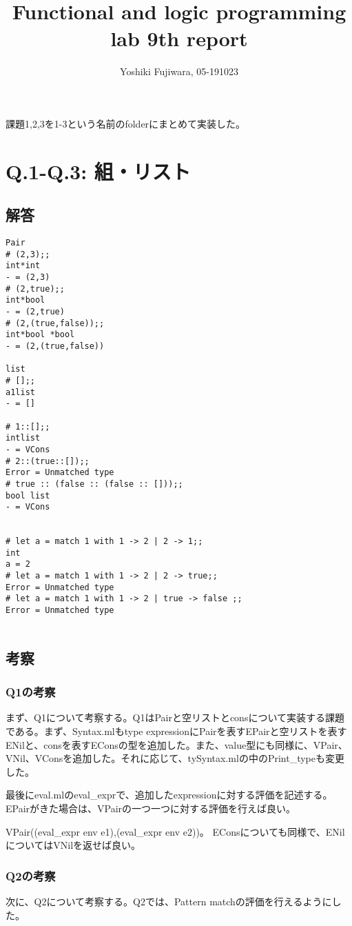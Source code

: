 \documentclass[uplatex,12pt]{jsarticle}
\title {Functional and logic programming lab 9th report}
\date{}
\begin{document}
\author{Yoshiki Fujiwara, 05-191023}
\maketitle

課題1,2,3を1-3という名前のfolderにまとめて実装した。

\section{Q.1-Q.3: 組・リスト}
\subsection{解答}
\begin{lstlisting}[caption=動作例]
Pair
# (2,3);;
int*int
- = (2,3)
# (2,true);;
int*bool
- = (2,true)
# (2,(true,false));;
int*bool *bool
- = (2,(true,false))

list
# [];;
a1list
- = []

# 1::[];;
intlist
- = VCons
# 2::(true::[]);;
Error = Unmatched type
# true :: (false :: (false :: []));;
bool list
- = VCons


# let a = match 1 with 1 -> 2 | 2 -> 1;;
int
a = 2
# let a = match 1 with 1 -> 2 | 2 -> true;;
Error = Unmatched type
# let a = match 1 with 1 -> 2 | true -> false ;;
Error = Unmatched type


\end{lstlisting}

\subsection{考察}
\subsubsection{Q1の考察}
まず、Q1について考察する。Q1はPairと空リストとconsについて実装する課題である。まず、Syntax.mlもtype expressionにPairを表すEPairと空リストを表すENilと、consを表すEConsの型を追加した。また、value型にも同様に、VPair、VNil、VConsを追加した。それに応じて、tySyntax.mlの中のPrint\_typeも変更した。

最後にeval.mlのeval\_exprで、追加したexpressionに対する評価を記述する。EPairがきた場合は、VPairの一つ一つに対する評価を行えば良い。

VPair((eval\_expr env e1),(eval\_expr env e2))。
EConsについても同様で、ENilについてはVNilを返せば良い。

\subsubsection{Q2の考察}
次に、Q2について考察する。Q2では、Pattern matchの評価を行えるようにした。
\end{document}
